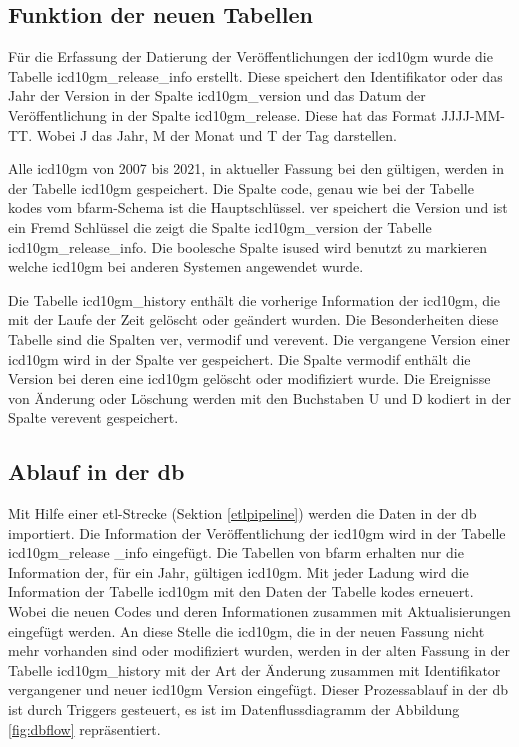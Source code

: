 \subsection{Funktion der neuen Tabellen} \label{newtables}

Für die Erfassung der Datierung der Veröffentlichungen der \ac{icd10gm} wurde die Tabelle {\ttfamily icd10gm\_release\_info} erstellt. Diese speichert den Identifikator oder das Jahr der Version in der Spalte {\ttfamily icd10gm\_version} und das Datum der Veröffentlichung in der Spalte {\ttfamily icd10gm\_release}. Diese hat das Format {\ttfamily JJJJ-MM-TT}. Wobei J das Jahr, M der Monat und T der Tag darstellen.

Alle \ac{icd10gm} von 2007 bis 2021, in aktueller Fassung bei den gültigen, werden in der Tabelle {\ttfamily icd10gm} gespeichert. Die Spalte {\ttfamily code}, genau wie bei der Tabelle {\ttfamily kodes} vom \ac{bfarm}-Schema ist die Hauptschlüssel. {\ttfamily ver} speichert die Version und ist ein Fremd Schlüssel die zeigt die Spalte {\ttfamily icd10gm\_version} der Tabelle {\ttfamily icd10gm\_release\_info}. Die boolesche Spalte {\ttfamily isused} wird benutzt zu markieren welche \ac{icd10gm} bei anderen Systemen angewendet wurde.

Die Tabelle {\ttfamily icd10gm\_history} enthält die vorherige Information der \ac{icd10gm}, die mit der Laufe der Zeit gelöscht oder geändert wurden. Die Besonderheiten diese Tabelle sind die Spalten {\ttfamily ver}, {\ttfamily vermodif} und {\ttfamily verevent}. Die vergangene Version einer \ac{icd10gm} wird in der Spalte {\ttfamily ver} gespeichert. Die Spalte {\ttfamily vermodif} enthält die Version bei deren eine \ac{icd10gm} gelöscht oder modifiziert wurde. Die Ereignisse von Änderung oder Löschung werden mit den Buchstaben {\ttfamily U} \grqq{} und {\ttfamily D} \grqq{} kodiert in der Spalte {\ttfamily verevent} gespeichert.

\subsection{Ablauf in der \acl{db}} \label{dbrun}

Mit Hilfe einer \ac{etl}-Strecke (Sektion \ref{etlpipeline}) werden die Daten in der \ac{db} importiert. Die Information der Veröffentlichung der \ac{icd10gm} wird in der Tabelle {\ttfamily icd10gm\_release \_info} eingefügt. Die Tabellen von \ac{bfarm} erhalten nur die Information der, für ein Jahr, gültigen \ac{icd10gm}. Mit jeder Ladung wird die Information der Tabelle {\ttfamily icd10gm} mit den Daten der Tabelle {\ttfamily kodes} erneuert. Wobei die neuen Codes und deren Informationen zusammen mit Aktualisierungen eingefügt werden. An diese Stelle die \ac{icd10gm}, die in der neuen Fassung nicht mehr vorhanden sind oder modifiziert wurden, werden in der alten Fassung in der Tabelle {\ttfamily icd10gm\_history} mit der Art der Änderung zusammen mit Identifikator vergangener und neuer \ac{icd10gm} Version eingefügt. Dieser Prozessablauf in der \ac{db} ist durch Triggers gesteuert, es ist im Datenflussdiagramm der Abbildung \ref{fig:dbflow} repräsentiert.

